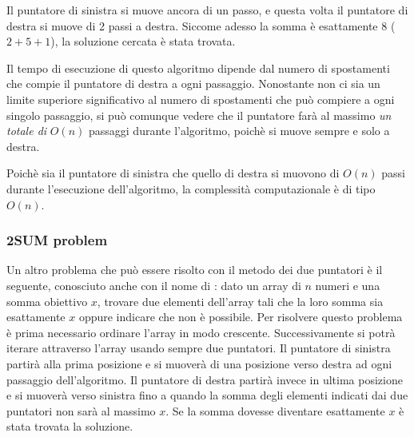 Il puntatore di sinistra si muove ancora di un passo, 
e questa volta il puntatore di destra si muove di 2 passi
a destra.
Siccome adesso la somma è esattamente 8 ($2+5+1$),
la soluzione cercata è stata trovata.

\begin{center}
\end{center}

Il tempo di esecuzione di questo algoritmo dipende
dal numero di spostamenti che compie il puntatore
di destra a ogni passaggio.
Nonostante non ci sia un limite superiore significativo 
al numero di spostamenti che può compiere a ogni singolo
passaggio, si può comunque vedere che il puntatore farà al 
massimo \emph{un totale di}
$O(n)$ passaggi durante l'algoritmo,
poichè si muove sempre e solo a destra.

Poichè sia il puntatore di sinistra che quello di destra
si muovono di $O(n)$ passi durante l'esecuzione dell'algoritmo,
la complessità computazionale è di tipo $O(n)$.

\subsubsection{2SUM problem}


Un altro problema che può essere risolto con 
il metodo dei due puntatori è il seguente, 
conosciuto anche con il nome di  :
dato un array di $n$ numeri e una somma obiettivo $x$,
trovare due elementi dell'array tali che la loro
somma sia esattamente $x$ oppure indicare
che non è possibile.
Per risolvere questo problema è prima
necessario ordinare l'array in modo crescente.
Successivamente si potrà iterare attraverso l'array
usando sempre due puntatori.
Il puntatore di sinistra partirà alla prima posizione
e si muoverà di una posizione verso destra ad ogni
passaggio dell'algoritmo.
Il puntatore di destra partirà invece in ultima posizione
e si muoverà verso sinistra fino a quando la somma degli 
elementi indicati dai due puntatori non
sarà al massimo $x$.
Se la somma dovesse diventare esattamente $x$
è stata trovata la soluzione.

